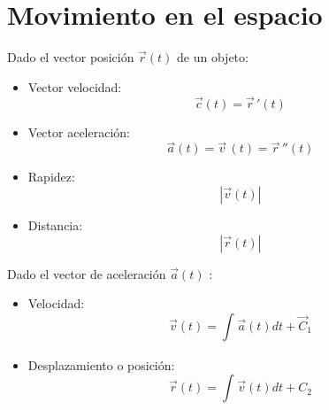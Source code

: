 \section{Movimiento en el espacio}
Dado el vector posición $\vec{r}(t)$ de un objeto: 
\begin{itemize}
    \item Vector velocidad:
        \[
          \vec{c}(t) = \vec{r}\, ' (t)
        \]
    
    \item Vector aceleración:
        \[
          \vec{a}(t) = \vec{v}\, (t) = \vec{r}\, '' (t)
        \]
    
    \item Rapidez:
        \[
          \left| \vec{v}(t) \right| 
        \]
    
    \item Distancia:
        \[
          \left| \vec{r}(t) \right| 
        \]    
\end{itemize}

Dado el vector de aceleración $\vec{a}(t)$ :
\begin{itemize}
    \item Velocidad:
        \[
          \vec{v}(t) = \int_{}^{}\vec{a}(t)dt + \vec{C}_1
        \]
    
    \item Desplazamiento o posición:
        \[
          \vec{r}(t) = \int_{}^{} \vec{v}(t)dt + C_2 
        \]
\end{itemize}


